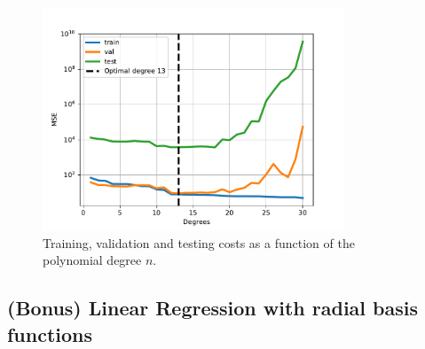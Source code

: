 \documentclass{article}
\begin{document}
\begin{figure}[!ht]
\centering
\includegraphics[width=0.8\textwidth]{./Figures/linreg_poly4_errors.pdf}
\caption{Training, validation and testing costs as a function of the polynomial degree $n$.}
\label{linreg_poly4}
\end{figure}


\subsection{(Bonus) Linear Regression with radial basis functions}
\end{document}
